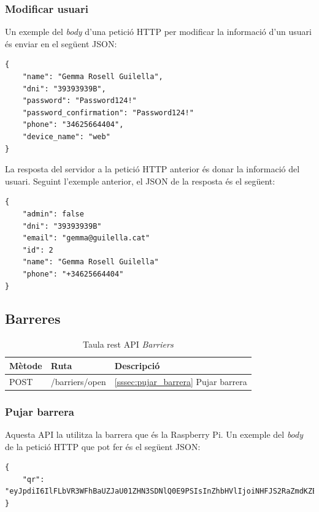 \subsubsection{Modificar usuari}
\label{sssec:modificar_usuari}

Un exemple del \emph{body} d'una petició HTTP per modificar la informació d'un usuari és enviar
en el següent JSON:
\begin{verbatim}
{
    "name": "Gemma Rosell Guilella",
    "dni": "39393939B",
    "password": "Password124!"
    "password_confirmation": "Password124!"
    "phone": "34625664404",
    "device_name": "web"
}
\end{verbatim}

La resposta del servidor a la petició HTTP anterior és donar la informació del usuari.
Seguint l'exemple anterior, el JSON de la resposta és el següent:
\begin{verbatim}
{
    "admin": false
    "dni": "39393939B"
    "email": "gemma@guilella.cat"
    "id": 2
    "name": "Gemma Rosell Guilella"
    "phone": "+34625664404"
}
\end{verbatim}

\subsection{Barreres}


\begin{table}[H]
\centering
\begin{tabular}{lll}
\hline
\textbf{Mètode} & \textbf{Ruta} & \textbf{Descripció} \\ \hline
POST            & /barriers/open &  \autoref{sssec:pujar_barrera}{ Pujar barrera}     \\ \hline
\end{tabular}
\caption{Taula rest API \emph{Barriers}}
\label{tab:my-barriers-api-table}
\end{table}

\subsubsection{Pujar barrera}
\label{sssec:pujar_barrera}

Aquesta API la utilitza la barrera que és la Raspberry Pi. Un exemple del \emph{body} de la petició HTTP
que pot fer és el següent JSON:
\begin{verbatim}
{
    "qr": "eyJpdiI6IlFLbVR3WFhBaUZJaU01ZHN3SDNlQ0E9PSIsInZhbHVlIjoiNHFJS2RaZmdKZEtQeUNZM0lkamhFVDY2QTBFZE9od0UraFNoOFltZDlhZkl3ZGtiWmRxSDdDNWZLT01Uc1dWU255YmNZV2hCdWtHaTVyTFhyck5GNHozQ2tGVUR2bmliYnpIaDNhV25PTWhuOXNXTy93MElDNUJnMXJiaEZkNmkiLCJtYWMiOiJiN2E0NmI4MTJlMzVkNjQzZmNhOTQyY2IzODQxYTIzMDc3OTc4NTdhZjZhZjlhMTQxNTdiNmU5MTg1NGNmMjZhIiwidGFnIjoiIn0=",
}
\end{verbatim}

